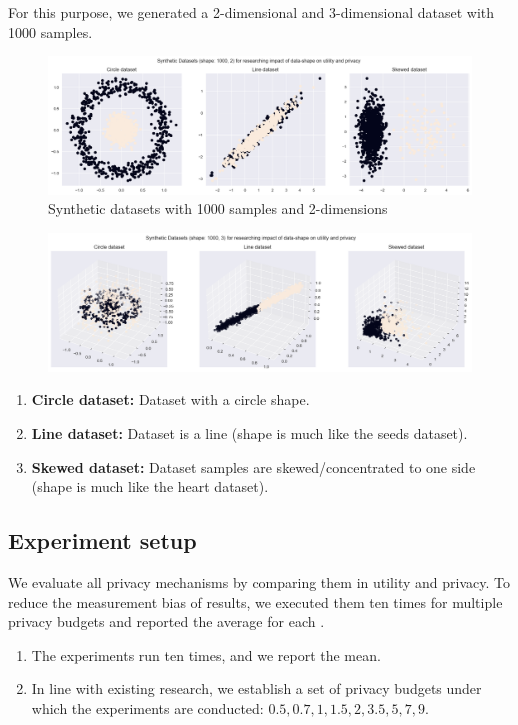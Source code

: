 For this purpose, we generated a 2-dimensional and 3-dimensional dataset with 1000 samples.
\begin{figure}[H]
    \includegraphics[width=1.0\textwidth]{Method//images/2d-shapes.png}
    \caption{Synthetic datasets with 1000 samples and 2-dimensions}
    \label{rq3:synthetic-datasets}
\end{figure}
\begin{figure}[H]
    \includegraphics[width=1.0\textwidth]{3d-shapes.png}
    \label{rq3:synthetic-datasets-3d}
\end{figure}

\begin{enumerate}
    \item \textbf{Circle dataset:} Dataset with a circle shape.
    \item \textbf{Line dataset:} Dataset is a line (shape is much like the seeds dataset).
    \item \textbf{Skewed dataset:} Dataset samples are skewed/concentrated to one side (shape is much like the heart dataset).
\end{enumerate}
\subsection{Experiment setup}
We evaluate all privacy mechanisms by comparing them in utility and privacy.
To reduce the measurement bias of results, we executed them ten times for multiple privacy budgets and reported the average for each \citep{9679364}.
\begin{enumerate}
    \item The experiments run ten times, and we report the mean.
    \item In line with existing research, we establish a set of privacy budgets under which the experiments are conducted: ${0.5, 0.7, 1, 1.5, 2, 3.5, 5, 7, 9}$.
\end{enumerate}

